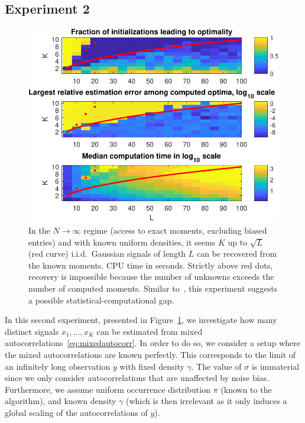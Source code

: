 \documentclass[12pt]{article}
\newcommand{\1}{\mathbf{1}}
\theoremstyle{plain}
\theoremstyle{definition}
\theoremstyle{remark}
\theoremstyle{plain}
\theoremstyle{remark}
\theoremstyle{plain}
\theoremstyle{plain}
\theoremstyle{plain}
\numberwithin{equation}{section}
\begin{document}
\subsection{Experiment 2}

\begin{figure}[t]
	\centering
	\includegraphics[width=.7\linewidth]{KLXP/XP1}
	\caption{In the $N \to \infty$ regime (access to exact moments, excluding biased entries) and with known uniform densities, it seems $K$ up to $\sqrt{L}$ (red curve) i.i.d.\ Gaussian signals of length $L$ can be recovered from the known moments. CPU time in seconds. Strictly above red dots, recovery is impossible because the number of unknowns exceeds the number of computed moments. Similar to~\cite[Fig.~4.1]{boumal2017heterogeneous}, this experiment suggests a possible statistical-computational gap.}
	\label{fig:KLXP}
\end{figure}

In this second experiment, presented in Figure~\ref{fig:KLXP}, we investigate how many distinct signals $x_1, \ldots, x_K$ can be estimated from mixed autocorrelations~\eqref{eq:mixedautocorr}. In order to do so, we consider a setup where the mixed autocorrelations are known perfectly. This corresponds to the limit of an infinitely long observation $y$ with fixed density $\gamma$. The value of $\sigma$ is immaterial since we only consider autocorrelations that are unaffected by noise bias. Furthermore, we assume uniform occurrence distribution $\pi$ (known to the algorithm), and known density $\gamma$ (which is then irrelevant as it only induces a global scaling of the autocorrelations of $y$).
\end{document}
